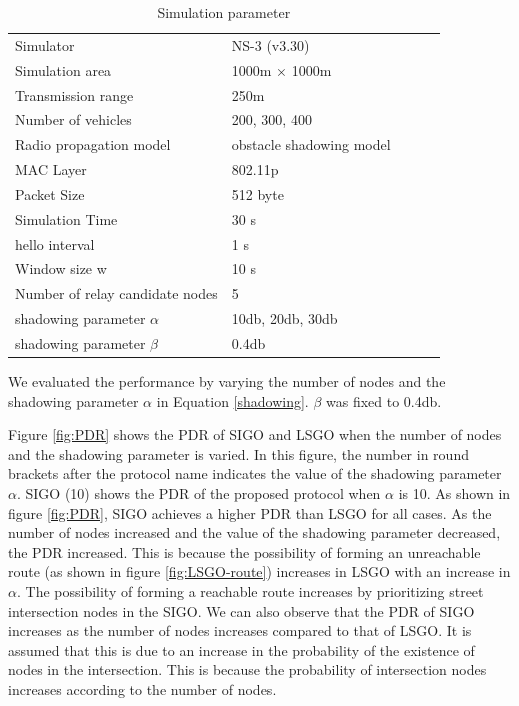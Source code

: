 \documentclass[conference]{IEEEtran}
\begin{document}
\begin{table}[!ht]
\begin{center}
\caption{Simulation parameter}
\label{tab:parameter}
\begin{tabular}{|l|l|lll}
\cline{1-2}
Simulator    & NS-3 (v3.30) &  &  &  \\ \cline{1-2}
Simulation area    & 1000m × 1000m   &  &  &  \\ \cline{1-2}
Transmission range & 250m            &  &  &  \\ \cline{1-2}
Number of vehicles & 200, 300, 400      &  &  &  \\ \cline{1-2}
Radio propagation model    & obstacle shadowing model\cite{20}&  &  &  \\ \cline{1-2}
MAC Layer     & 802.11p &  &  &  \\ \cline{1-2}
Packet Size & 512 byte       &  &  &  \\ \cline{1-2}
Simulation Time & 30 s      &  &  &  \\ \cline{1-2}
hello interval & 1 s      &  &  &  \\ \cline{1-2}
Window size w  & 10 s      &  &  &  \\ \cline{1-2}
Number of relay candidate nodes  & 5       &  &  \\ \cline{1-2}
shadowing parameter $\alpha$  & 10db, 20db, 30db       &  &  &  \\ \cline{1-2}
shadowing parameter $\beta$    & 0.4db &  &  \\ \cline{1-2}
\end{tabular}
\end{center}
\end{table}





We evaluated the performance by varying the number of nodes and the shadowing parameter $\alpha$ in Equation \ref{shadowing}. 
$\beta$ was fixed to 0.4db.





Figure \ref{fig:PDR} shows the PDR of SIGO and LSGO when the number of nodes and the shadowing parameter is varied. 
In this figure, the number in round brackets after the protocol name indicates the value of the shadowing parameter $\alpha$. SIGO (10) shows the PDR of the proposed protocol when $\alpha$ is 10.
As shown in figure \ref{fig:PDR}, SIGO achieves a higher PDR than LSGO for all cases. 
As the number of nodes increased and the value of the shadowing parameter decreased, the PDR increased. This is because the possibility of forming an unreachable route (as shown in figure \ref{fig:LSGO-route}) increases in LSGO with an increase in $\alpha$. The possibility of forming a reachable route increases by prioritizing street intersection nodes in the SIGO.
We can also observe that the PDR of SIGO increases as the number of nodes increases compared to that of LSGO. It is assumed that this is due to an increase in the probability of the existence of nodes in the intersection. 
This  is because the probability of intersection nodes increases according to the number of nodes.
\end{document}

